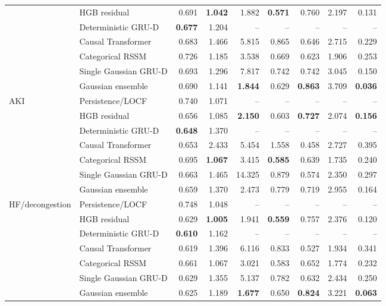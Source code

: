 \begin{table}[p]
\begin{tabular}{llrrrrrrr}
 & HGB residual & 0.691 & \textbf{1.042} & 1.882 & \textbf{0.571} & 0.760 & 2.197 & 0.131 \\
 & Deterministic GRU-D & \textbf{0.677} & 1.204 & -- & -- & -- & -- & -- \\
 & Causal Transformer & 0.683 & 1.466 & 5.815 & 0.865 & 0.646 & 2.715 & 0.229 \\
 & Categorical RSSM & 0.726 & 1.185 & 3.538 & 0.669 & 0.623 & 1.906 & 0.253 \\
 & Single Gaussian GRU-D & 0.693 & 1.296 & 7.817 & 0.742 & 0.742 & 3.045 & 0.150 \\
 & Gaussian ensemble & 0.690 & 1.141 & \textbf{1.844} & 0.629 & \textbf{0.863} & 3.709 & \textbf{0.036} \\
\midrule
\multirow{7}{*}{AKI} & Persistence/LOCF & 0.740 & 1.071 & -- & -- & -- & -- & -- \\
 & HGB residual & 0.656 & 1.085 & \textbf{2.150} & 0.603 & \textbf{0.727} & 2.074 & \textbf{0.156} \\
 & Deterministic GRU-D & \textbf{0.648} & 1.370 & -- & -- & -- & -- & -- \\
 & Causal Transformer & 0.653 & 2.433 & 5.454 & 1.558 & 0.458 & 2.727 & 0.395 \\
 & Categorical RSSM & 0.695 & \textbf{1.067} & 3.415 & \textbf{0.585} & 0.639 & 1.735 & 0.240 \\
 & Single Gaussian GRU-D & 0.663 & 1.465 & 14.325 & 0.879 & 0.574 & 2.350 & 0.297 \\
 & Gaussian ensemble & 0.659 & 1.370 & 2.473 & 0.779 & 0.719 & 2.955 & 0.164 \\
\midrule
\multirow{7}{*}{HF/decongestion} & Persistence/LOCF & 0.748 & 1.048 & -- & -- & -- & -- & -- \\
 & HGB residual & 0.629 & \textbf{1.005} & 1.941 & \textbf{0.559} & 0.757 & 2.376 & 0.120 \\
 & Deterministic GRU-D & \textbf{0.610} & 1.162 & -- & -- & -- & -- & -- \\
 & Causal Transformer & 0.619 & 1.396 & 6.116 & 0.833 & 0.527 & 1.934 & 0.341 \\
 & Categorical RSSM & 0.661 & 1.067 & 3.021 & 0.583 & 0.652 & 1.774 & 0.232 \\
 & Single Gaussian GRU-D & 0.629 & 1.355 & 5.137 & 0.782 & 0.632 & 2.434 & 0.250 \\
 & Gaussian ensemble & 0.625 & 1.189 & \textbf{1.677} & 0.650 & \textbf{0.824} & 3.221 & \textbf{0.063} \\
\bottomrule
\end{tabular}
\end{table}
